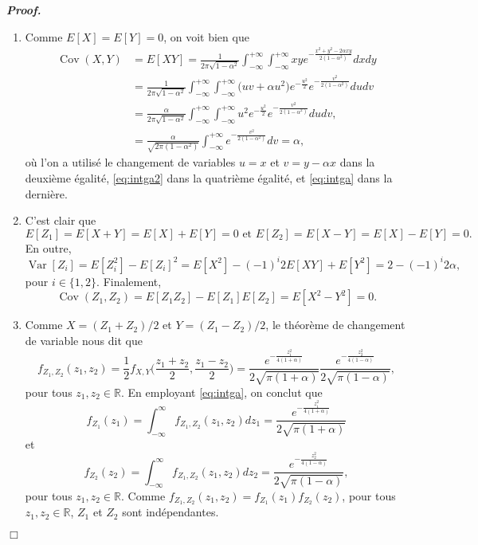 \documentclass[11pt,a4paper]{article}
\newcommand{\RR}{\mathbb{R}}
\newenvironment{preuve}[1][]
{\vskip 2mm  \noindent\emph{\bf Proof#1. }}{$\Box$ \vskip 2mm}
\begin{document}
\begin{preuve}
\begin{enumerate}
				\item Comme $E[X] = E[Y] = 0$, on voit bien que 
				\begin{align*}
				\operatorname{Cov}(X,Y) &= E[X Y] = \frac{1}{2\pi \sqrt{1-\alpha^2}} \int_{- \infty}^{+ \infty} \int_{- \infty}^{+ \infty} x y e^{-\frac{x^2+y^2-2\alpha xy}{2(1-\alpha^2)}} dx dy 
				\\
				&= \frac{1}{2\pi \sqrt{1-\alpha^2}} \int_{- \infty}^{+ \infty} \int_{- \infty}^{+ \infty} \big(uv + \alpha u^{2}\big) e^{-\frac{u^2}{2}} e^{-\frac{v^2}{2(1-\alpha^2)}} du dv 
				\\
				&= \frac{\alpha}{2\pi \sqrt{1-\alpha^2}} \int_{- \infty}^{+ \infty} \int_{- \infty}^{+ \infty} u^{2} e^{-\frac{u^2}{2}} e^{-\frac{v^2}{2(1-\alpha^2)}} du dv,      
				\\
				&=\frac{\alpha}{\sqrt{2\pi  (1-\alpha^2)}} \int_{- \infty}^{+ \infty} e^{-\frac{v^2}{2(1-\alpha^2)}} dv = \alpha,      
				\end{align*}
				où l'on a utilisé le changement de variables $u = x$ et $v = y - \alpha x$ dans la deuxième égalité, 
				\eqref{eq:intga2} dans la quatrième égalité, et \eqref{eq:intga} dans la dernière. 
				
				\item C'est clair que 
				\[     E[Z_{1}] = E[X+Y] = E[X] + E[Y] = 0 \text{ et } E[Z_{2}] = E[X-Y] = E[X] - E[Y] = 0.     \]
				En outre, 
				\[     \operatorname{Var}[Z_{i}] = E[Z_{i}^{2}] - E[Z_{i}]^{2} = E[X^{2}] -(-1)^{i} 2 E[X Y] + E[Y^{2}] = 2 - (-1)^{i}2 \alpha,      \]
				pour $i \in \{ 1, 2\}$. 
				Finalement, 
				\[     \operatorname{Cov}(Z_{1},Z_{2}) = E[Z_{1} Z_{2}] - E[Z_{1}] E[Z_{2}] = E[X^{2} - Y^{2}] = 0.     \]
				
				\item Comme $X = (Z_{1} + Z_{2})/2$ et $Y = (Z_{1} - Z_{2})/2$, le théorème de changement de variable nous dit que 
				\[     f_{Z_{1},Z_{2}}(z_{1},z_{2}) = \frac{1}{2} f_{X,Y}\bigg(\frac{z_{1} + z_{2}}{2}, \frac{z_{1} - z_{2}}{2}\bigg) 
				= \frac{e^{-\frac{z_{1}^2}{4(1+\alpha)}}}{2 \sqrt{\pi (1+\alpha)}} \frac{e^{-\frac{z_{2}^2}{4(1-\alpha)}}}{2 \sqrt{\pi (1-\alpha)}},     \]
				pour tous $z_{1}, z_{2} \in \RR$. 
				En employant \eqref{eq:intga}, on conclut que 
				\[     f_{Z_{1}}(z_{1}) = \int_{- \infty}^{\infty} f_{Z_{1},Z_{2}}(z_{1},z_{2}) dz_{1} = \frac{e^{-\frac{z_{1}^2}{4(1+\alpha)}}}{2 \sqrt{\pi (1+\alpha)}}   \]
				et 
				\[     f_{Z_{2}}(z_{2}) = \int_{- \infty}^{\infty} f_{Z_{1},Z_{2}}(z_{1},z_{2}) dz_{2} = \frac{e^{-\frac{z_{2}^2}{4(1-\alpha)}}}{2 \sqrt{\pi (1-\alpha)}},     \]
				pour tous $z_{1}, z_{2} \in \RR$. 
				Comme $ f_{Z_{1},Z_{2}}(z_{1},z_{2}) = f_{Z_{1}}(z_{1}) f_{Z_{2}}(z_{2})$, pour tous $z_{1}, z_{2} \in \RR$, $Z_1$ et $Z_2$ sont indépendantes. 
			\end{enumerate} 
		\end{preuve}
		
	
\end{document}

